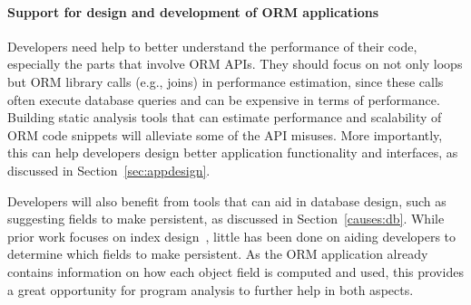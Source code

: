 \vspace{-0.12in}
\paragraph{\bf{Support for design and development of ORM applications}}
Developers need help to better understand the performance of their code, especially the parts that involve ORM APIs.
They should focus on not only loops but ORM library calls (e.g., joins) in performance estimation, since these calls often execute database queries and can be expensive in terms of performance.
Building static analysis tools that can estimate performance 
and scalability of ORM code snippets will alleviate some of the API misuses.
More importantly, this can help developers design 
better application functionality and interfaces, as discussed in Section~\ref{sec:appdesign}. 

Developers will also benefit from tools that can aid in database design, such as suggesting 
fields to make persistent, as discussed in Section~\ref{causes:db}.
While prior work focuses on index design~\cite{autoadmin}, little has been done on aiding developers to determine which fields to make persistent.
As the ORM application already contains information on how each object field is computed and used,
this provides a great opportunity for program analysis to further help in both aspects.

